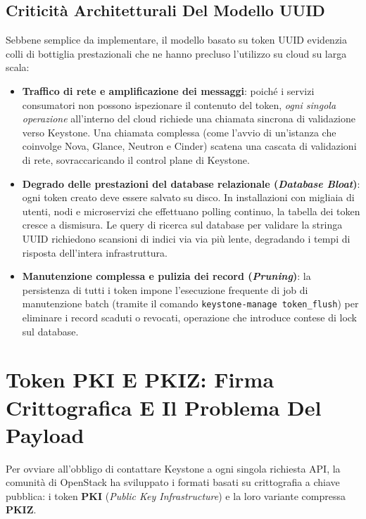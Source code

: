 \documentclass[11pt, a4paper]{article}
\begin{document}

\subsection{Criticità Architetturali Del Modello UUID}

Sebbene semplice da implementare, il modello basato su token UUID evidenzia colli di bottiglia prestazionali che ne hanno precluso l'utilizzo su cloud su larga scala:

\begin{itemize}
    \item \textbf{Traffico di rete e amplificazione dei messaggi}: poiché i servizi consumatori non possono ispezionare il contenuto del token, \emph{ogni singola operazione} all'interno del cloud richiede una chiamata sincrona di validazione verso Keystone. Una chiamata complessa (come l'avvio di un'istanza che coinvolge Nova, Glance, Neutron e Cinder) scatena una cascata di validazioni di rete, sovraccaricando il control plane di Keystone.
    \item \textbf{Degrado delle prestazioni del database relazionale (\emph{Database Bloat})}: ogni token creato deve essere salvato su disco. In installazioni con migliaia di utenti, nodi e microservizi che effettuano polling continuo, la tabella dei token cresce a dismisura. Le query di ricerca sul database per validare la stringa UUID richiedono scansioni di indici via via più lente, degradando i tempi di risposta dell'intera infrastruttura.
    \item \textbf{Manutenzione complessa e pulizia dei record (\emph{Pruning})}: la persistenza di tutti i token impone l'esecuzione frequente di job di manutenzione batch (tramite il comando \texttt{keystone-manage token\_flush}) per eliminare i record scaduti o revocati, operazione che introduce contese di lock sul database.
\end{itemize}

\newpage

\section{Token PKI E PKIZ: Firma Crittografica E Il Problema Del Payload}

Per ovviare all'obbligo di contattare Keystone a ogni singola richiesta API, la comunità di OpenStack ha sviluppato i formati basati su crittografia a chiave pubblica: i token \textbf{PKI} (\emph{Public Key Infrastructure}) e la loro variante compressa \textbf{PKIZ}.
\end{document}
